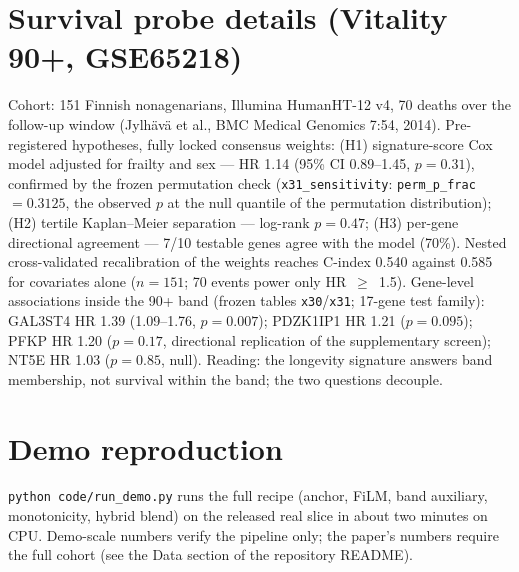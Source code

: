 \documentclass[11pt]{article}
\begin{document}
\section{Survival probe details (Vitality 90+, GSE65218)}
Cohort: 151 Finnish nonagenarians, Illumina HumanHT-12 v4, 70 deaths over the
follow-up window (Jylh\"av\"a et al., BMC Medical Genomics 7:54, 2014).
Pre-registered hypotheses, fully locked consensus weights: (H1) signature-score
Cox model adjusted for frailty and sex --- HR 1.14 (95\% CI 0.89--1.45,
$p=0.31$), confirmed by the frozen permutation check (\texttt{x31\_sensitivity}:
\texttt{perm\_p\_frac}$=0.3125$, the observed $p$ at the null quantile of
the permutation distribution); (H2) tertile Kaplan--Meier
separation --- log-rank $p=0.47$; (H3) per-gene directional agreement --- 7/10
testable genes agree with the model (70\%). Nested cross-validated recalibration
of the weights reaches C-index 0.540 against 0.585 for covariates alone
($n=151$; 70 events power only HR~$\ge$~1.5). Gene-level associations inside the
90+ band (frozen tables \texttt{x30}/\texttt{x31}; 17-gene test family):
GAL3ST4 HR 1.39 (1.09--1.76, $p=0.007$); PDZK1IP1 HR 1.21 ($p=0.095$);
PFKP HR 1.20 ($p=0.17$, directional replication of the supplementary screen);
NT5E HR 1.03 ($p=0.85$, null). Reading: the longevity signature answers band
membership, not survival within the band; the two questions decouple.

\section{Demo reproduction}
\texttt{python code/run\_demo.py} runs the full recipe (anchor, FiLM, band
auxiliary, monotonicity, hybrid blend) on the released real slice in about two
minutes on CPU. Demo-scale numbers verify the pipeline only; the paper's numbers
require the full cohort (see the Data section of the repository README).
\end{document}
